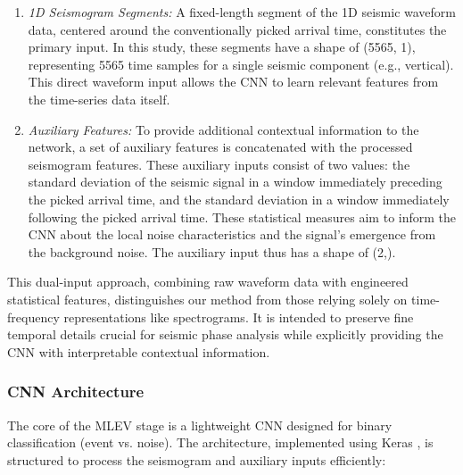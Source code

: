 \documentclass[conference]{IEEEtran}
\begin{document}
        \begin{enumerate}
            \item \textit{1D Seismogram Segments:} A fixed-length segment of the 1D seismic waveform data, centered
            around the conventionally picked arrival time, constitutes the primary input. In this study, these segments
            have a shape of (5565, 1), representing 5565 time samples for a single seismic component (e.g., vertical).
            This direct waveform input allows the CNN to learn relevant features from the time-series data itself.
            \item \textit{Auxiliary Features:} To provide additional contextual information to the network, a set of
            auxiliary features is concatenated with the processed seismogram features. These auxiliary inputs consist of
            two values: the standard deviation of the seismic signal in a window immediately preceding the picked
            arrival time, and the standard deviation in a window immediately following the picked arrival time. These
            statistical measures aim to inform the CNN about the local noise characteristics and the signal's emergence
            from the background noise. The auxiliary input thus has a shape of (2,).
        \end{enumerate}
        This dual-input approach, combining raw waveform data with engineered statistical features, distinguishes our
        method from those relying solely on time-frequency representations like spectrograms. It is intended to preserve
        fine temporal details crucial for seismic phase analysis while explicitly providing the CNN with interpretable
        contextual information.

        \subsubsection{CNN Architecture}
            The core of the MLEV stage is a lightweight CNN designed for binary classification (event vs. noise). The
            architecture, implemented using Keras \cite{Chollet2021}, is structured to process the seismogram and
            auxiliary inputs efficiently:
        
\end{document}
